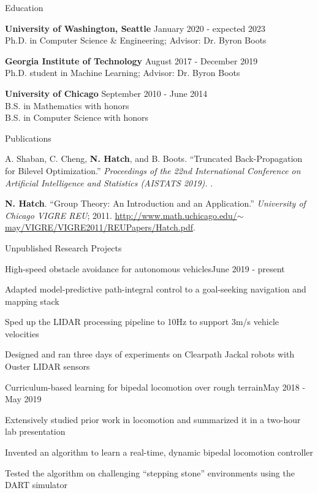 \documentclass{resume} %
\begin{document}
\begin{rSection}{Education}

{\bf University of Washington, Seattle} \hfill {January 2020 - expected 2023} \\
Ph.D. in Computer Science \& Engineering; Advisor: Dr. Byron Boots

{\bf Georgia Institute of Technology} \hfill {August 2017 - December 2019} \\
Ph.D. student in Machine Learning; Advisor: Dr. Byron Boots

{\bf University of Chicago} \hfill {September 2010 - June 2014} \\
B.S. in Mathematics with honors \\
B.S. in Computer Science with honors

\end{rSection}

\begin{rSection}{Publications}

A. Shaban, C. Cheng, {\bf N. Hatch}, and B. Boots. ``Truncated Back-Propagation for Bilevel Optimization.''
{\em Proceedings of the 22nd International Conference on Artificial Intelligence and Statistics (AISTATS 2019).}
.

{\bf N. Hatch}. ``Group Theory: An Introduction and an Application.'' {\em University of Chicago VIGRE REU}; 2011.
\href{http://www.math.uchicago.edu/~may/VIGRE/VIGRE2011/REUPapers/Hatch.pdf}{http://www.math.uchicago.edu/$\sim$may/VIGRE/VIGRE2011/REUPapers/Hatch.pdf}.

\end{rSection}

\begin{rSection}{Unpublished Research Projects}

\begin{rProject}{High-speed obstacle avoidance for autonomous vehicles}{June 2019 - present}
\item Adapted model-predictive path-integral control to a goal-seeking navigation and mapping stack
\item Sped up the LIDAR processing pipeline to 10Hz to support 3m/s vehicle velocities
\item Designed and ran three days of experiments on Clearpath Jackal robots with Ouster LIDAR sensors
\end{rProject}

\begin{rProject}{Curriculum-based learning for bipedal locomotion over rough terrain}{May 2018 - May 2019}
\item Extensively studied prior work in locomotion and summarized it in a two-hour lab presentation
\item Invented an algorithm to learn a real-time, dynamic bipedal locomotion controller
\item Tested the algorithm on challenging ``stepping stone'' environments using the DART simulator
\end{rProject}

\end{rSection}
\end{document}

